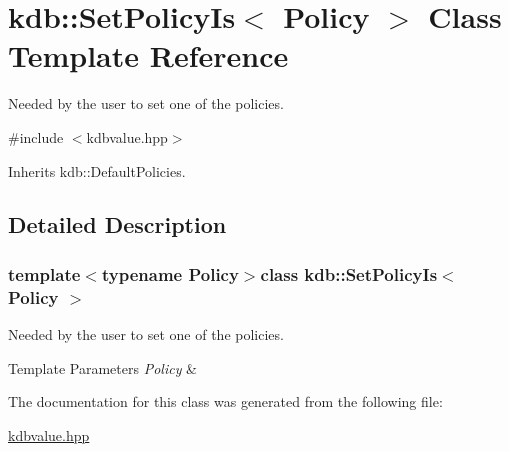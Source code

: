 \hypertarget{classkdb_1_1SetPolicyIs}{\section{kdb\+:\+:Set\+Policy\+Is$<$ Policy $>$ Class Template Reference}
\label{classkdb_1_1SetPolicyIs}
}


Needed by the user to set one of the policies.  




{\ttfamily \#include $<$kdbvalue.\+hpp$>$}



Inherits kdb\+::\+Default\+Policies.



\subsection{Detailed Description}
\subsubsection*{template$<$typename Policy$>$class kdb\+::\+Set\+Policy\+Is$<$ Policy $>$}

Needed by the user to set one of the policies. 


\begin{DoxyTemplParams}{Template Parameters}
{\em Policy} & \\
\hline
\end{DoxyTemplParams}


The documentation for this class was generated from the following file\+:\begin{DoxyCompactItemize}
\item 
\hyperlink{kdbvalue_8hpp}{kdbvalue.\+hpp}\end{DoxyCompactItemize}
